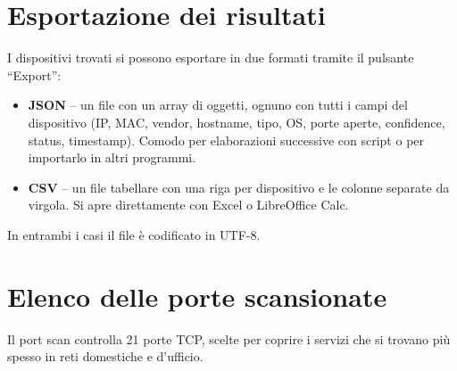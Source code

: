 \documentclass[a4paper,11pt]{article}
\begin{document}
\section{Esportazione dei risultati}

I dispositivi trovati si possono esportare in due formati tramite
il pulsante ``Export'':

\begin{itemize}[nosep]
  \item \textbf{JSON} -- un file con un array di oggetti, ognuno
        con tutti i campi del dispositivo (IP, MAC, vendor,
        hostname, tipo, OS, porte aperte, confidence, status,
        timestamp).  Comodo per elaborazioni successive con
        script o per importarlo in altri programmi.
  \item \textbf{CSV} -- un file tabellare con una riga per
        dispositivo e le colonne separate da virgola.
        Si apre direttamente con Excel o LibreOffice Calc.
\end{itemize}

In entrambi i casi il file è codificato in UTF-8.


\section{Elenco delle porte scansionate}

Il port scan controlla 21 porte TCP, scelte per coprire i servizi
che si trovano più spesso in reti domestiche e d'ufficio.
\end{document}
